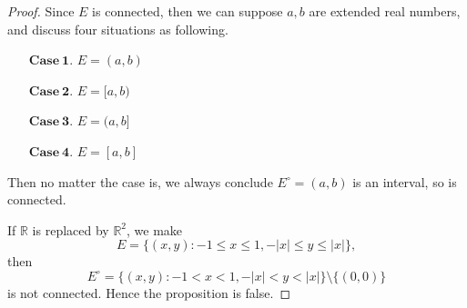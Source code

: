 \begin{Exercise}
\begin{proof}
Since $E$ is connected, then we can suppose $a,b$ are extended real numbers, and discuss four situations as following.
\begin{enumerate}
\item [$\mathbf{Case\ 1.}$]
$E = (a,b)$

\item [$\mathbf{Case\ 2.}$]
$E = [a,b)$

\item [$\mathbf{Case\ 3.}$]
$E = (a,b]$

\item [$\mathbf{Case\ 4.}$]
$E = [a,b]$

\end{enumerate}

Then no matter the case is, we always conclude $E^\circ = (a,b)$ is an interval, so is connected.

\vspace{2ex}

If $\mathbb{R}$ is replaced by $\mathbb{R}^2$, we make $$E = \{(x,y):-1\leq x \leq 1, -|x| \leq y \leq |x|\},$$ then $$E^\circ = \{(x,y):-1 < x < 1, -|x| < y < |x|\}\setminus \{(0,0)\}$$ is not connected. Hence the proposition is false.
\end{proof}
\end{Exercise}